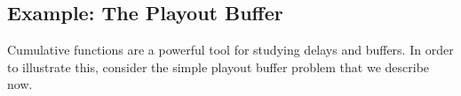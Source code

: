 \subsection{Example: The Playout Buffer}
 Cumulative functions are a powerful tool
for studying delays and buffers. In order to illustrate this,
consider the simple playout buffer problem that we describe now.
%
%
%
%
%
